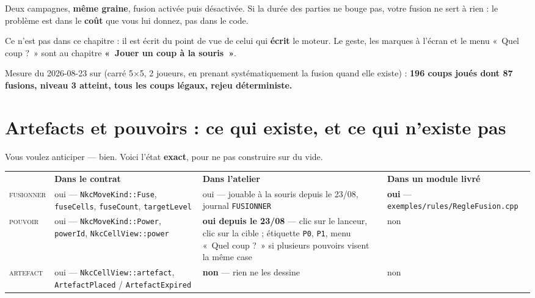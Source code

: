 \begin{nkretenir}[Ce qu'on en mesure]
Deux campagnes, \textbf{même graine}, fusion activée puis désactivée. Si la
durée des parties ne bouge pas, votre fusion ne sert à rien : le problème est
dans le \textbf{coût} que vous lui donnez, pas dans le code.

\begin{nkretenir}
Ce n'est pas dans ce chapitre : il est écrit du point de vue de celui qui
\textbf{écrit} le moteur. Le geste, les marques à l'écran et le menu
«~Quel coup ?~» sont au chapitre \textbf{«~Jouer un coup à la souris~»}.
\end{nkretenir}

Mesure du 2026-08-23 sur  (carré 5$\times$5, 2 joueurs,
en prenant systématiquement la fusion quand elle existe) : \textbf{196 coups
joués dont 87 fusions, niveau 3 atteint, tous les coups légaux, rejeu
déterministe.}
\end{nkretenir}

\section{Artefacts et pouvoirs : ce qui existe, et ce qui n'existe pas}

Vous voulez anticiper --- bien. Voici l'état \textbf{exact}, pour ne pas
construire sur du vide.

\begin{center}
\begin{tabular}{@{}p{2.4cm}p{3.6cm}p{3.6cm}p{3.4cm}@{}}
\textbf{} & \textbf{Dans le contrat} & \textbf{Dans l'atelier} & \textbf{Dans un module livré} \\
\textsc{fusionner} & oui --- \texttt{NkcMoveKind::Fuse}, \texttt{fuseCells}, \texttt{fuseCount}, \texttt{targetLevel} & oui --- jouable à la souris depuis le 23/08, journal \texttt{FUSIONNER} & \textbf{oui} --- \texttt{exemples/rules/RegleFusion.cpp} \\
\textsc{pouvoir} & oui --- \texttt{NkcMoveKind::Power}, \texttt{powerId}, \texttt{NkcCellView::power} & \textbf{oui depuis le 23/08} --- clic sur le lanceur, clic sur la cible ; étiquette \texttt{P0}, \texttt{P1}, menu «~Quel coup ?~» si plusieurs pouvoirs visent la même case & non \\
\textsc{artefact} & oui --- \texttt{NkcCellView::artefact}, \texttt{ArtefactPlaced} / \texttt{ArtefactExpired} & \textbf{non} --- rien ne les dessine & non \\
\end{tabular}
\end{center}

